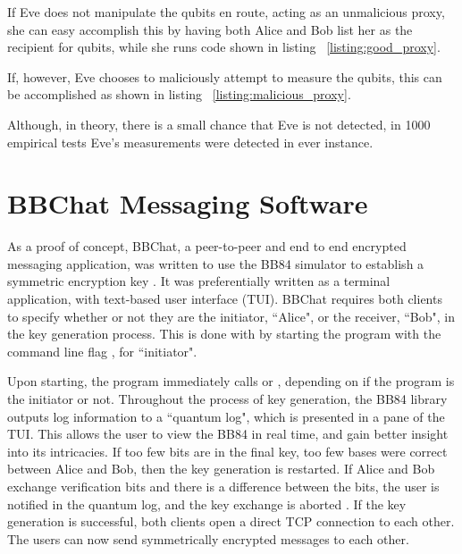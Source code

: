 If Eve does not manipulate the qubits en route, acting as an unmalicious proxy, she can easy accomplish this by having both Alice and Bob list her as the recipient for qubits, while she runs code shown in listing ~\ref{listing:good_proxy}.
\begin{figure}[htp]
\noindent
\begin{minipage}{\linewidth}
\begin{singlespace}

\end{singlespace}
\end{minipage}
\end{figure}
If, however, Eve chooses to maliciously attempt to measure the qubits, this can be accomplished as shown in listing ~\ref{listing:malicious_proxy}.
\begin{figure}[htp]
\noindent
\begin{minipage}{\linewidth}
\begin{singlespace}

\end{singlespace}
\end{minipage}
\end{figure}
Although, in theory, there is a small chance that Eve is not detected, in 1000 empirical tests Eve's measurements were detected in ever instance.

\section{BBChat Messaging Software}
As a proof of concept, BBChat, a peer-to-peer and end to end encrypted messaging application, was written to use the BB84 simulator to establish a symmetric encryption key \cite{bbchat}.
It was preferentially written as a terminal application, with text-based user interface (TUI).
BBChat requires both clients to specify whether or not they are the initiator, ``Alice", or the receiver, ``Bob", in the key generation process.
This is done with by starting the program with the command line flag , for ``initiator".

Upon starting, the program immediately calls  or , depending on if the program is the initiator or not.
Throughout the process of key generation, the BB84 library outputs log information to a ``quantum log", which is presented in a pane of the TUI. 
This allows the user to view the BB84 in real time, and gain better insight into its intricacies.
If too few bits are in the final key, too few bases were correct between Alice and Bob, then the key generation is restarted.
If Alice and Bob exchange verification bits and there is a difference between the bits, the user is notified in the quantum log, and the key exchange is aborted \cite{bbchat}.
If the key generation is successful, both clients open a direct TCP connection to each other.
The users can now send symmetrically encrypted messages to each other. 


